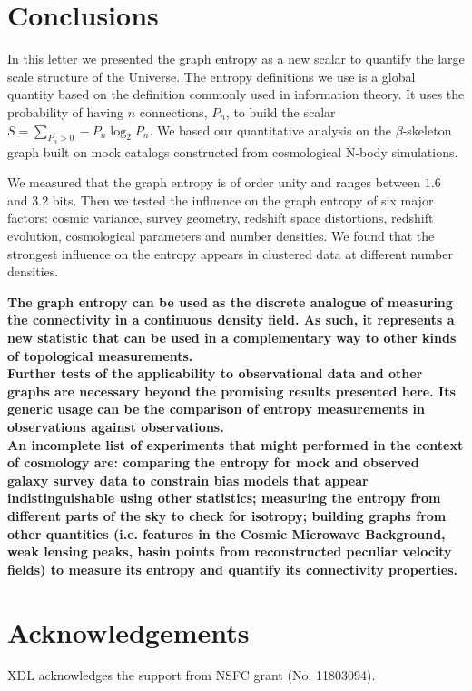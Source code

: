 \documentclass[fleqn,usenatbib]{mnras}
\begin{document}
\section{Conclusions}

In this letter we presented the graph entropy as a new scalar to 
quantify the large scale structure of the Universe.
The entropy definitions we use is a global quantity based on 
the definition commonly used in information theory.
It uses the probability of having $n$ connections, $P_n$, to build the 
scalar $S=\sum_{P_n>0} -P_n  \log_2 P_n$. 
We based our quantitative analysis on the $\beta$-skeleton graph 
built on mock catalogs constructed from cosmological N-body simulations.

We measured that the graph entropy is of order unity and ranges 
between $1.6$ and $3.2$ bits.
Then we tested the influence on the graph entropy of six major factors: 
cosmic variance, survey geometry, redshift space distortions, redshift evolution, cosmological parameters and number densities.
We found that the strongest influence on the entropy appears in
clustered data at different number  densities.

\textbf{The graph entropy can be used as the discrete analogue
  of measuring the connectivity in a continuous density field.
  As such, it represents a new statistic that can be used in a complementary way to other kinds of topological measurements.\\
 \indent
 Further tests of the applicability to observational data and other graphs are necessary beyond the  promising results presented here.
 Its generic usage can be the comparison of entropy measurements in observations against observations.\\
 \indent
 An incomplete list of experiments that might performed in the context of cosmology are:  comparing the entropy for mock and observed galaxy survey data to constrain bias models that appear indistinguishable using other statistics; measuring the entropy from different parts of the sky to check for isotropy; 
building graphs from  other quantities (i.e. features in the Cosmic Microwave Background, weak lensing peaks,
basin points from reconstructed peculiar velocity fields) to measure its entropy and quantify its connectivity properties.
}

\section*{Acknowledgements}
XDL acknowledges the support from NSFC grant (No. 11803094).




\end{document}
